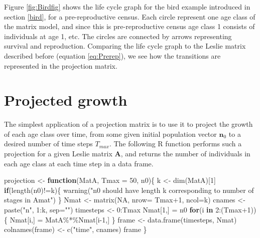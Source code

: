 \documentclass[
]{book}
\newenvironment{Shaded}{\begin{snugshade}}{\end{snugshade}}
\newcommand{\AttributeTok}[1]{\textcolor[rgb]{0.77,0.63,0.00}{#1}}
\newcommand{\ConstantTok}[1]{\textcolor[rgb]{0.00,0.00,0.00}{#1}}
\newcommand{\ControlFlowTok}[1]{\textcolor[rgb]{0.13,0.29,0.53}{\textbf{#1}}}
\newcommand{\DecValTok}[1]{\textcolor[rgb]{0.00,0.00,0.81}{#1}}
\newcommand{\FunctionTok}[1]{\textcolor[rgb]{0.00,0.00,0.00}{#1}}
\newcommand{\NormalTok}[1]{#1}
\newcommand{\OtherTok}[1]{\textcolor[rgb]{0.56,0.35,0.01}{#1}}
\newcommand{\SpecialCharTok}[1]{\textcolor[rgb]{0.00,0.00,0.00}{#1}}
\newcommand{\StringTok}[1]{\textcolor[rgb]{0.31,0.60,0.02}{#1}}
\begin{document}
Figure \ref{fig:Birdfig} shows the life cycle graph for the bird example introduced in section \ref{bird}, for a pre-reproductive census. Each circle represent one age class of the matrix model, and since this is pre-reproductive census age class 1 consists of individuals at age 1, etc. The circles are connected by arrows representing survival and reproduction. Comparing the life cycle graph to the Leslie matrix described before (equation \eqref{eq:Prerep}), we see how the transitions are represented in the projection matrix.

\hypertarget{projected-growth}{%
\section{Projected growth}\label{projected-growth}}

The simplest application of a projection matrix is to use it to project the growth of each age class over time, from some given initial population vector \(\mathbf{n}_0\) to a desired number of time steps \(T_{max}\). The following R function performs such a projection for a given Leslie matrix \(\mathbf{A}\), and returns the number of individuals in each age class at each time step in a data frame.

\begin{Shaded}
\begin{Highlighting}[]
\NormalTok{projection }\OtherTok{\textless{}{-}} \ControlFlowTok{function}\NormalTok{(MatA, }\AttributeTok{Tmax =} \DecValTok{50}\NormalTok{, n0)\{}
\NormalTok{  k }\OtherTok{\textless{}{-}} \FunctionTok{dim}\NormalTok{(MatA)[}\DecValTok{1}\NormalTok{]}
  \ControlFlowTok{if}\NormalTok{(}\FunctionTok{length}\NormalTok{(n0)}\SpecialCharTok{!=}\NormalTok{k)\{}
      \FunctionTok{warning}\NormalTok{(}\StringTok{"n0 should have length k corresponding to number of stages in Amat"}\NormalTok{)}
\NormalTok{      \}}
\NormalTok{  Nmat }\OtherTok{\textless{}{-}} \FunctionTok{matrix}\NormalTok{(}\ConstantTok{NA}\NormalTok{, }\AttributeTok{nrow=}\NormalTok{ Tmax}\SpecialCharTok{+}\DecValTok{1}\NormalTok{, }\AttributeTok{ncol=}\NormalTok{k)}
\NormalTok{  cnames }\OtherTok{\textless{}{-}} \FunctionTok{paste}\NormalTok{(}\StringTok{"n"}\NormalTok{, }\DecValTok{1}\SpecialCharTok{:}\NormalTok{k, }\AttributeTok{sep=}\StringTok{""}\NormalTok{)}
\NormalTok{  timesteps }\OtherTok{\textless{}{-}} \DecValTok{0}\SpecialCharTok{:}\NormalTok{Tmax}
\NormalTok{  Nmat[}\DecValTok{1}\NormalTok{,] }\OtherTok{=}\NormalTok{ n0 }
  \ControlFlowTok{for}\NormalTok{(i }\ControlFlowTok{in} \DecValTok{2}\SpecialCharTok{:}\NormalTok{(Tmax}\SpecialCharTok{+}\DecValTok{1}\NormalTok{))\{  }
\NormalTok{    Nmat[i,] }\OtherTok{=}\NormalTok{ MatA}\SpecialCharTok{\%*\%}\NormalTok{Nmat[i}\DecValTok{{-}1}\NormalTok{,]}
\NormalTok{  \}}
\NormalTok{  frame }\OtherTok{\textless{}{-}} \FunctionTok{data.frame}\NormalTok{(timesteps, Nmat)}
  \FunctionTok{colnames}\NormalTok{(frame) }\OtherTok{\textless{}{-}} \FunctionTok{c}\NormalTok{(}\StringTok{"time"}\NormalTok{, cnames)}
\NormalTok{  frame}
\NormalTok{\}}
\end{Highlighting}
\end{Shaded}
\end{document}
